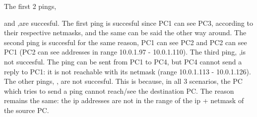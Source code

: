 The first 2 pings, \newline

 \newline and \newline
 \newline
,are succesful. The first ping is succesful since PC1 can see PC3, according to their respective netmasks, and the same can be said the other way around. \newline
The second ping is succesful for the same reason, PC1 can see PC2 and PC2 can see PC1 (PC2 can see addresses in range 10.0.1.97 - 10.0.1.110). \newline
\newline
The third ping, \newline
 \newline
,is not succesful. The ping can be sent from PC1 to PC4, but PC4 cannot send a reply to PC1: it is not reachable with its netmask (range 10.0.1.113 - 10.0.1.126). \newline
\newline
The other pings, \newline
 \newline
 \newline
 \newline
, are not succesful. This is because, in all 3 scenarios, the PC which tries to send a ping cannot reach/see the destination PC. The reason remains the same: the ip addresses are not in the range of the ip + netmask of the source PC.
